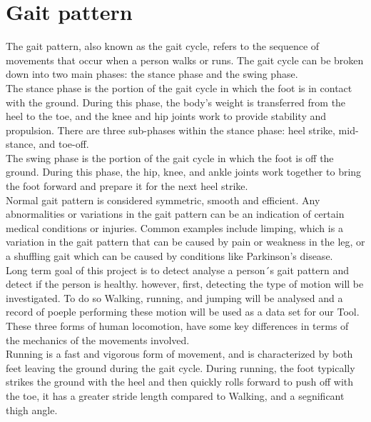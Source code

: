 \section{Gait pattern}

\hfill \break
The gait pattern, also known as the gait cycle, refers to the sequence of movements that occur when a person walks or runs. The gait cycle can be broken down into two main phases: the stance phase and the swing phase.\\

The stance phase is the portion of the gait cycle in which the foot is in contact with the ground. During this phase, the body's weight is transferred from the heel to the toe, and the knee and hip joints work to provide stability and propulsion. There are three sub-phases within the stance phase: heel strike, mid-stance, and toe-off.\\
The swing phase is the portion of the gait cycle in which the foot is off the ground. During this phase, the hip, knee, and ankle joints work together to bring the foot forward and prepare it for the next heel strike.\\

Normal gait pattern is considered symmetric, smooth and efficient. Any abnormalities or variations in the gait pattern can be an indication of certain medical conditions or injuries. Common examples include limping, which is a variation in the gait pattern that can be caused by pain or weakness in the leg, or a shuffling gait which can be caused by conditions like Parkinson's disease.\\

Long term goal of this project is to detect analyse a person´s gait pattern and detect if the person is healthy. however, first, detecting the type of motion will be investigated.
To do so Walking, running, and jumping will be analysed and a record of poeple performing these motion will be used as a data set for our Tool. 
These three forms of human locomotion, have some key differences in terms of the mechanics of the movements involved.\\

Running is a fast and vigorous form of movement, and is characterized by both feet leaving the ground during the gait cycle. During running, the foot typically strikes the ground with the heel and then quickly rolls forward to push off with the toe, it has a greater stride length compared to Walking, and a segnificant thigh angle.\\

